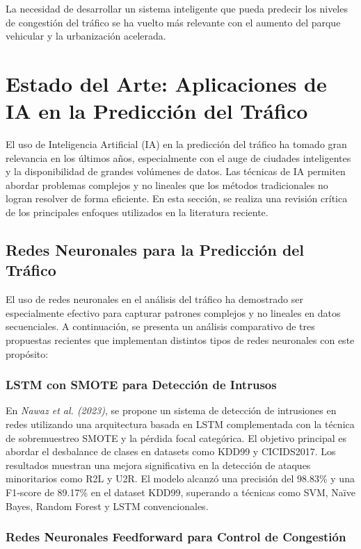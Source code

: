 \documentclass{svproc} %
\begin{document}
La necesidad de desarrollar un sistema inteligente que pueda predecir los niveles de
congestión del tráfico se ha vuelto más relevante con el aumento del parque vehicular y
la urbanización acelerada.

\section{Estado del Arte: Aplicaciones de IA en la Predicción del Tráfico}
El uso de Inteligencia Artificial (IA) en la predicción del tráfico
ha tomado gran relevancia en los últimos años, especialmente con 
el auge de ciudades inteligentes y la disponibilidad de grandes volúmenes de datos.
Las técnicas de IA permiten abordar problemas complejos y no lineales que los métodos
 tradicionales no logran resolver de forma eficiente. En esta sección, se realiza una 
 revisión crítica de los principales enfoques utilizados en la literatura reciente.

\subsection{Redes Neuronales para la Predicción del Tráfico}

 El uso de redes neuronales en el análisis del tráfico ha demostrado ser especialmente efectivo para capturar patrones complejos y no lineales en datos secuenciales. A continuación, se presenta un análisis comparativo de tres propuestas recientes que implementan distintos tipos de redes neuronales con este propósito:
 
\subsubsection{LSTM con SMOTE para Detección de Intrusos}
 
 En \textit{Nawaz et al. (2023)}, se propone un sistema de detección de intrusiones en redes utilizando una arquitectura basada en LSTM complementada con la técnica de sobremuestreo SMOTE y la pérdida focal categórica. El objetivo principal es abordar el desbalance de clases en datasets como KDD99 y CICIDS2017. Los resultados muestran una mejora significativa en la detección de ataques minoritarios como R2L y U2R. El modelo alcanzó una precisión del 98.83\% y una F1-score de 89.17\% en el dataset KDD99, superando a técnicas como SVM, Naïve Bayes, Random Forest y LSTM convencionales.
 
\subsubsection{Redes Neuronales Feedforward para Control de Congestión}
 
\end{document}
